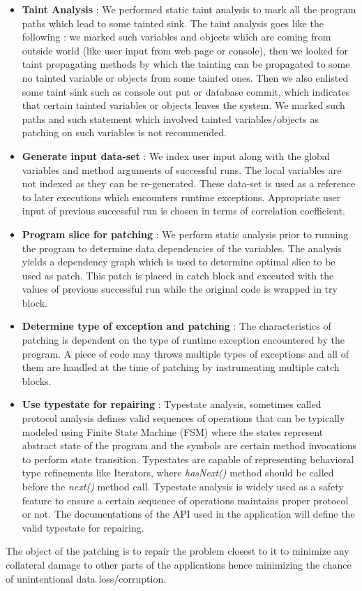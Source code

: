 \begin{itemize}
  \item \textbf{Taint Analysis} : We performed static taint analysis to mark all
  the program paths which lead to some tainted sink. The taint analysis goes
  like the following : we marked such variables and objects which are coming
  from outside world (like user input from web page or console), then we looked
  for taint propagating methods by which the tainting can be propagated to some no
  tainted variable or objects from some tainted ones. Then we also enlisted some
  taint sink such as console out put or database commit, which indicates that
  certain tainted variables or objects leaves the system. We marked such paths
  and such statement which involved tainted variables/objects as patching on
  such variables is not recommended.
  \item \textbf{Generate input data-set} : We index user input along with the
  global variables and method arguments of successful runs.
  The local variables are not indexed as they can be re-generated.
  These data-set is used as a reference to later executions which encounters
  runtime exceptions.
  Appropriate user input of previous successful run is chosen in terms of
  correlation coefficient.
  
  \item \textbf{Program slice for patching} : We perform static analysis prior
  to running the program to determine data dependencies of the variables.
  The analysis yields a dependency graph which is used to determine optimal
  slice to be used as patch.
  This patch is placed in catch block and executed with the values of previous
  successful run while the original code is wrapped in try block.
  
  \item \textbf{Determine type of exception and patching} : The characteristics
  of patching is dependent on the type of runtime exception encountered by the
  program. A piece of code may throws multiple types of exceptions and all of
  them are handled at the time of patching by instrumenting multiple catch
  blocks.
  
  \item \textbf{Use typestate for repairing} : Typestate analysis, sometimes
  called protocol analysis defines valid sequences of operations that can be
  typically modeled using Finite State Machine (FSM) where the states represent
  abstract state of the program and the symbols are certain method invocations
  to perform state transition. Typestates are capable of representing behavioral
  type refinements like Iterators, where \emph{hasNext()} method should be
  called before the \emph{next()} method call.
  Typestate analysis is widely used as a safety feature to ensure a certain
  sequence of operations maintains proper protocol or not.
  The documentations of the API used in the application will define the valid
  typestate for repairing.
\end{itemize}

The object of the patching is to repair the problem closest to it to minimize
any collateral damage to other parts of the applications hence minimizing the
chance of unintentional data loss/corruption.




